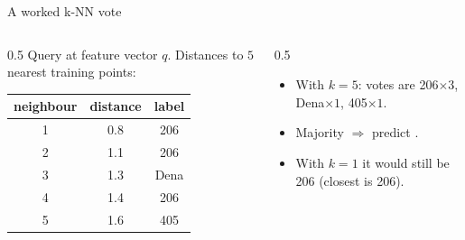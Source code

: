 \documentclass[10pt,aspectratio=169]{beamer}
\begin{document}
\begin{frame}{A worked k-NN vote}
  \begin{columns}[T]
    \begin{column}{0.5\textwidth}
      Query at feature vector $q$. Distances to $5$ nearest training points:
      \begin{center}
      \begin{tabular}{@{}ccc@{}}
        \toprule
        neighbour & distance & label \\
        \midrule
        1 & 0.8 & 206 \\
        2 & 1.1 & 206 \\
        3 & 1.3 & Dena \\
        4 & 1.4 & 206 \\
        5 & 1.6 & 405 \\
        \bottomrule
      \end{tabular}
      \end{center}
    \end{column}
    \begin{column}{0.5\textwidth}
      \begin{itemize}
        \item With $k=5$: votes are 206$\times3$, Dena$\times1$, 405$\times1$.
        \item Majority $\Rightarrow$ predict .
        \item With $k=1$ it would still be 206 (closest is 206).
      \end{itemize}
    \end{column}
  \end{columns}
\end{frame}
\end{document}
